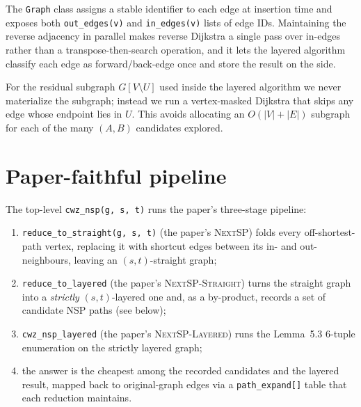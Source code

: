 The \texttt{Graph} class assigns a stable identifier to each edge at
insertion time and exposes both \texttt{out\_edges(v)} and
\texttt{in\_edges(v)} lists of edge IDs. Maintaining the reverse
adjacency in parallel makes reverse Dijkstra a single pass over in-edges
rather than a transpose-then-search operation, and it lets the layered
algorithm classify each edge as forward/back-edge once and store the
result on the side.

For the residual subgraph $G[V\setminus U]$ used inside the layered
algorithm we never materialize the subgraph; instead we run a
vertex-masked Dijkstra that skips any edge whose endpoint lies in
$U$. This avoids allocating an $O(|V|+|E|)$ subgraph for each of the
many $(A,B)$ candidates explored.

\section{Paper-faithful pipeline}
\label{sec:pipeline}

The top-level \texttt{cwz\_nsp(g, s, t)} runs the paper's three-stage
pipeline:
\begin{enumerate}
  \item \texttt{reduce\_to\_straight(g, s, t)} (the paper's
    \textsc{NextSP}) folds every off-shortest-path vertex, replacing it
    with shortcut edges between its in- and out-neighbours, leaving an
    $(s,t)$-straight graph;
  \item \texttt{reduce\_to\_layered} (the paper's
    \textsc{NextSP-Straight}) turns the straight graph into a
    \emph{strictly} $(s,t)$-layered one and, as a by-product, records a
    set of candidate NSP paths (see below);
  \item \texttt{cwz\_nsp\_layered} (the paper's \textsc{NextSP-Layered})
    runs the Lemma~5.3 $6$-tuple enumeration on the strictly layered
    graph;
  \item the answer is the cheapest among the recorded candidates and the
    layered result, mapped back to original-graph edges via a
    \texttt{path\_expand[]} table that each reduction maintains.
\end{enumerate}

